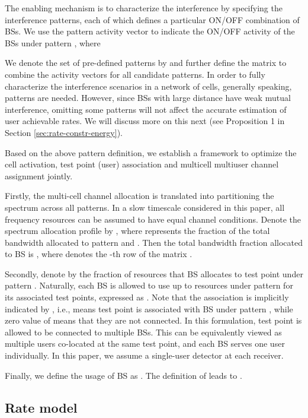 \documentclass{article}
\begin{document}
The enabling mechanism is to characterize the interference by
specifying the interference patterns, each of which defines a
particular ON/OFF combination of BSs. We use the pattern activity
vector  to
indicate the ON/OFF activity of the BSs under pattern , where

We denote the set of pre-defined patterns by  and further define the matrix  to combine the
activity vectors for all candidate patterns. In order to fully
characterize the interference scenarios in a network of  cells,
generally speaking,  patterns are needed. However, since BSs
with large distance have weak mutual interference, omitting some patterns
will not affect the accurate estimation of user achievable rates. We
will discuss more on this next (see Proposition 1 in Section
\ref{sec:rate-constr-energy}).

Based on the above pattern definition, we establish a framework to
optimize the cell activation, test point (user) association and
multicell multiuser channel assignment jointly.

Firstly, the multi-cell channel allocation is translated into
partitioning the spectrum across all patterns. In a slow timescale
considered in this paper, all frequency resources can be assumed to
have equal channel conditions. Denote the spectrum allocation profile
by , where  represents the fraction of the total bandwidth
allocated to pattern  and . Then the
total bandwidth fraction allocated to BS  is , where  denotes the -th row of
the matrix .

Secondly, denote by  the fraction of resources
that BS  allocates to test point  under pattern . Naturally,
each BS is allowed to use up to  resources under pattern 
for its associated test points, expressed as . Note that the
association is implicitly indicated by , i.e.,
 means test point  is associated with BS 
under pattern , while zero value of  means that they
are not connected. In this formulation, test point  is allowed to
be connected to multiple BSs. This can be equivalently viewed as
multiple users co-located at the same test point, and each BS serves
one user individually. In this paper, we assume a single-user detector
at each receiver.

Finally, we define the usage of BS  as . The definition of  leads to .

\subsection{Rate model}
\end{document}
